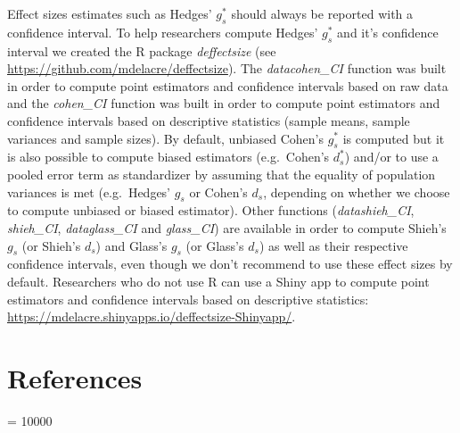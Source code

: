 \documentclass[
  english,
  man,floatsintext]{apa6}
\begin{document}
Effect sizes estimates such as Hedges' \(g^*_s\) should always be reported with a confidence interval. To help researchers compute Hedges' \(g^*_s\) and it's confidence interval we created the R package \emph{deffectsize} (see \url{https://github.com/mdelacre/deffectsize}). The \emph{datacohen\_CI} function was built in order to compute point estimators and confidence intervals based on raw data and the \emph{cohen\_CI} function was built in order to compute point estimators and confidence intervals based on descriptive statistics (sample means, sample variances and sample sizes). By default, unbiased Cohen's \(g^*_s\) is computed but it is also possible to compute biased estimators (e.g.~Cohen's \(d^*_s\)) and/or to use a pooled error term as standardizer by assuming that the equality of population variances is met (e.g.~Hedges' \(g_s\) or Cohen's \(d_s\), depending on whether we choose to compute unbiased or biased estimator). Other functions (\emph{datashieh\_CI}, \emph{shieh\_CI}, \emph{dataglass\_CI} and \emph{glass\_CI}) are available in order to compute Shieh's \(g_s\) (or Shieh's \(d_s\)) and Glass's \(g_s\) (or Glass's \(d_s\)) as well as their respective confidence intervals, even though we don't recommend to use these effect sizes by default. Researchers who do not use R can use a Shiny app to compute point estimators and confidence intervals based on descriptive statistics: \url{https://mdelacre.shinyapps.io/deffectsize-Shinyapp/}.

\hypertarget{references}{%
\section{References}\label{references}}

\begingroup

\interlinepenalty = 10000
\end{document}
